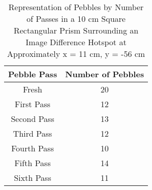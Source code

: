 
\begin{table}[H]
\centering
\caption{Representation of Pebbles by Number of Passes in a 10 cm Square Rectangular Prism Surrounding an Image Difference Hotspot at Approximately x = 11 cm, y = -56 cm}
 \begin{tabularx}{0.35\textwidth}{c  c}
 	\hline
 	Pebble Pass & Number of Pebbles \\
 	\hline
 	Fresh & 20 \\
 	First Pass & 12 \\
 	Second Pass & 13 \\
 	Third Pass & 12 \\
 	Fourth Pass & 10 \\
 	Fifth Pass & 14 \\
 	Sixth Pass & 11 \\
 	\hline
 \end{tabularx}
\label{table:10cmpebb}
\end{table}